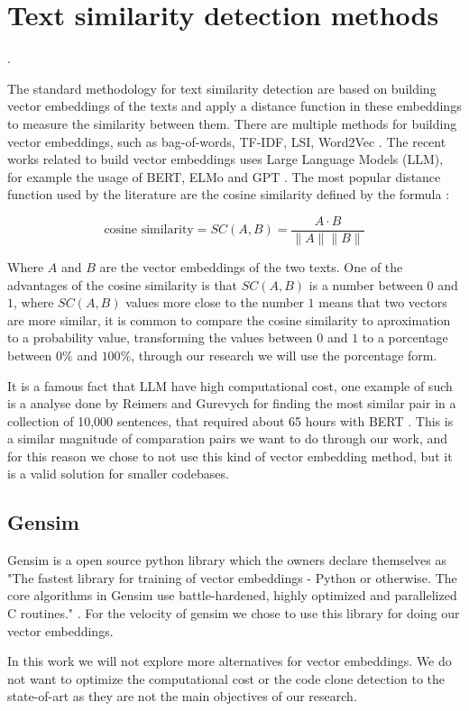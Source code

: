 \en

\section{Text similarity detection methods}
\label{sec:similarity}.

The standard methodology for text similarity detection are based on building vector embeddings of
the texts and apply a distance function in these embeddings to measure the similarity between them. 
There are multiple methods for building vector embeddings, such as bag-of-words, TF-IDF, LSI, Word2Vec \citep{gensimlivro}. 
The recent works related to build vector embeddings uses Large Language Models (LLM), for example the usage of BERT, ELMo 
and GPT \citep{llmsimilar}. The most popular distance function used by the literature are the cosine similarity 
defined by the formula \citep{cosineref}:

$$\text{cosine similarity} = SC(A,B) = \frac{ A \cdot B}{ \lVert A \rVert \lVert B \rVert }$$

Where $A$ and $B$ are the vector embeddings of the two texts. One of the advantages of the cosine similarity is that $SC(A,B)$ 
is a number between $0$ and $1$, where $SC(A,B)$ values more close to the number $1$ means that two vectors are more similar,
it is common to compare the cosine similarity to aproximation to a probability value, transforming the values between $0$ and $1$ to a
porcentage between $0 \% $ and $100\%$, through our research we will use the porcentage form.

It is a famous fact that LLM have high computational cost, one example of such is a analyse done by Reimers and Gurevych for 
finding the most similar pair in a collection of 10,000 sentences, that required about 65 hours with BERT \citep{bertsimilar}. This 
is a similar magnitude of comparation pairs we want to do through our work, and for this reason we chose to not use this kind of 
vector embedding method, but it is a valid solution for smaller codebases.

\subsection{Gensim}

Gensim is a open source python library \citep{gensim} which the owners declare themselves as "The fastest library 
for training of vector embeddings - Python or otherwise. The core algorithms in Gensim use battle-hardened, 
highly optimized and parallelized C routines." \citep{gensimsite}. For the velocity of gensim we chose to use this library
for doing our vector embeddings. 

In this work we will not explore more alternatives for vector embeddings. We do not want to optimize the computational 
cost or the code clone detection to the state-of-art as they are not the main objectives of our research.


